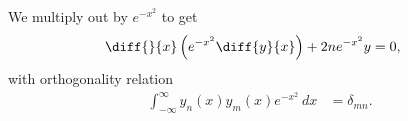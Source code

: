 \documentclass[10pt]{mypackage}
\begin{document}
\begin{solution}[11.4, Problem 10]
  We multiply out by $e^{-x^2}$ to get
  \begin{align*}
    \diff{}{x}\left( e^{-x^2}\diff{y}{x} \right) + 2ne^{-x^2}y &= 0,
  \end{align*}
  with orthogonality relation
  \begin{align*}
    \int_{-\infty}^{\infty} y_n(x)y_m(x)e^{-x^2}\:dx &= \delta_{mn}.
  \end{align*}
\end{solution}
\begin{solution}[12.3, Problem 2]

\end{solution}
\begin{solution}[12.3, Problem 4]

\end{solution}
\end{document}
